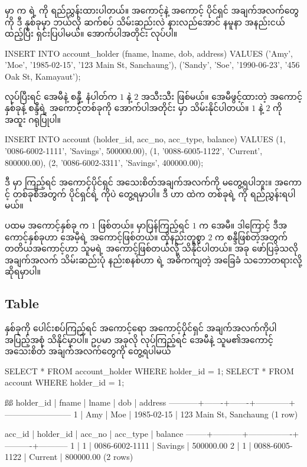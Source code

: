   မှာ   က   ရဲ့   ကို ရည်ညွှန်းထားပါတယ်။ အကောင့်နဲ့ အကောင့် ပိုင်ရှင် အချက်အလက်တွေကို ဒီ  နှစ်ခုမှာ ဘယ်လို ဆက်စပ် သိမ်းဆည်းလဲ နားလည်အောင် နမူနာ  အနည်းငယ်ထည့်ပြီး ရှင်းပြပါမယ်။ အောက်ပါအတိုင်း  လုပ်ပါ။
%
\begin{sql}
INSERT INTO account_holder (fname, lname, dob, address)
VALUES 
('Amy', 'Moe', '1985-02-15', '123 Main St, Sanchaung'),
('Sandy', 'Soe', '1990-06-23', '456 Oak St, Kamayaut');
\end{sql}
%
 လုပ်ပြီးရင် အေမီနဲ့ စန္ဒီ့  နံပါတ်က $1$ နဲ့ $2$ အသီးသီး ဖြစ်မယ်။ အေမီဖွင့်ထားတဲ့ အကောင့်နှစ်ခုနဲ့ စန္ဒီရဲ့ အကောင့်တစ်ခုကို အောက်ပါအတိုင်း   မှာ သိမ်းနိုင်ပါတယ်။  $1$ နဲ့ $2$ ကို အထူး ဂရုပြုပါ။
%
\begin{sql}
INSERT INTO account (holder_id, acc_no, acc_type, balance)
VALUES 
(1, '0086-6002-1111', 'Savings', 500000.00),
(1, '0088-6005-1122', 'Current', 800000.00),
(2, '0086-6002-3311', 'Savings', 400000.00);
\end{sql}
%
ဒီ  မှာ ကြည့်ရင် အကောင့်ပိုင်ရှင် အသေးစိတ်အချက်အလက်ကို မတွေ့ရပါဘူး။ အကောင့်  တစ်ခုစီအတွက်  ပိုင်ရှင်ရဲ့  ကိုပဲ တွေ့ရမှာပါ။ ဒီ  ဟာ   ထဲက  တစ်ခုရဲ့  ကို ရည်ညွှန်းရပါမယ်။ 

ပထမ အကောင့်နှစ်ခု  က $1$ ဖြစ်တယ်။   မှာပြန်ကြည့်ရင်  $1$ က အေမီ။ ဒါကြောင့် ဒီအကောင့်နှစ်ခုဟာ အေမီ့ရဲ့ အကောင့်ဖြစ်တယ်။ ထိုနည်းတူစွာ  $2$ က စန္ဒီဖြစ်တဲ့အတွက် တတိယအကောင့်ဟာ သူမရဲ့ အကောင့်ဖြစ်တယ်လို့ သိနိုင်ပါတယ်။ အခု ဖော်ပြခဲ့သလို အချက်အလက် သိမ်းဆည်းပုံ နည်းစနစ်ဟာ  ရဲ့ အဓိကကျတဲ့ အခြေခံ သဘောတရားလို့ ဆိုရမှာပါ။

\subsection*{Table }
 နှစ်ခုကို ပေါင်းစပ်ကြည့်ရင် အကောင့်ရော အကောင့်ပိုင်ရှင် အချက်အလက်ကိုပါ အပြည့်အစုံ သိနိုင်မှာပါ။ ဥပမာ အခုလို  လုပ်ကြည့်ရင် အေမီနဲ့ သူမ၏အကောင့် အသေးစိတ် အချက်အလက်တွေကို တွေ့ရပါမယ်
%
\begin{sql}
SELECT * FROM account_holder WHERE holder_id = 1;
SELECT * FROM account WHERE holder_id = 1;
\end{sql}
%
\begin{vbtm}
ßß
 holder_id | fname | lname |    dob     |        address
-----------+-------+-------+------------+------------------------
         1 | Amy   | Moe   | 1985-02-15 | 123 Main St, Sanchaung
(1 row)


 acc_id | holder_id |     acc_no     | acc_type |  balance
--------+-----------+----------------+----------+-----------
      1 |         1 | 0086-6002-1111 | Savings  | 500000.00
      2 |         1 | 0088-6005-1122 | Current  | 800000.00
(2 rows)
\end{vbtm}

